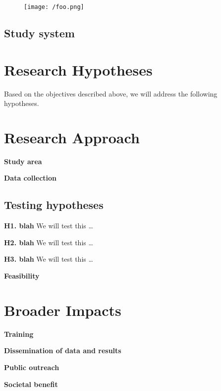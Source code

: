 \documentclass[10pt,letterpaper]{article}
\begin{document}
\Blindtext

\begin{figure}[h!]
\texttt{[image: /foo.png]}
\caption{\blindtext}
\label{fig:foo}
\end{figure}


\subsection{Study system}

\blindtext




\section{Research Hypotheses}

Based on the objectives described above, we will address the following hypotheses.

\blindenumerate


\section{Research Approach}

\textbf{Study area} \blindtext 

\noindent \textbf{Data collection} \blindtext

\subsection*{Testing hypotheses}

\noindent \textbf{H1. blah} We will test this \ldots
\blindtext

\noindent \textbf{H2. blah} We will test this \ldots
\blindtext

\noindent \textbf{H3. blah} We will test this \ldots
\blindtext



\noindent \textbf{Feasibility} 
\blindtext


\section{Broader Impacts}


\textbf{Training}  \blindtext 

\noindent \textbf{Dissemination of data and results} \blindtext

\noindent \textbf{Public outreach}  \blindtext 

\noindent \textbf{Societal benefit}  \blindtext 

\newpage

{\small
}
\end{document}
